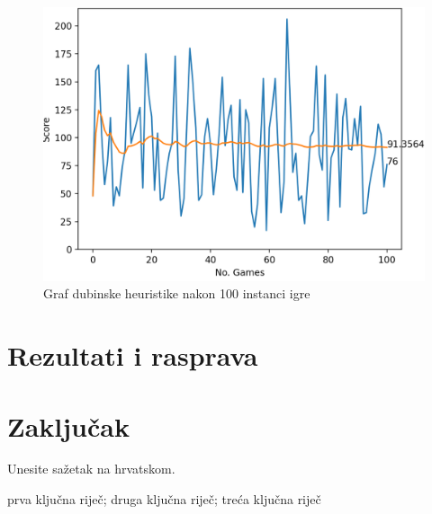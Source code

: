 \documentclass[zavrsnirad]{fer}
\begin{document}
\begin{figure}[htb]
	\centering
	\includegraphics[width=0.68\linewidth]{Figures/depth.png} 
	\caption{Graf dubinske heuristike nakon 100 instanci igre}
	\label{slk:depth_graph}
\end{figure}


\chapter{Rezultati i rasprava}
\label{pog:rezultati_i_rasprava}

\Blindtext


\chapter{Zaključak}
\label{pog:zakljucak}

\blindtext








\begin{sazetak}
  Unesite sažetak na hrvatskom.

  \blindtext
\end{sazetak}

\begin{kljucnerijeci}
  prva ključna riječ; druga ključna riječ; treća ključna riječ
\end{kljucnerijeci}
\end{document}
